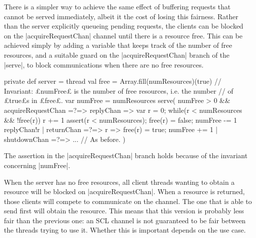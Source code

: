 

There is a simpler way to achieve the same effect of buffering requests that
cannot be served immediately, albeit it the cost of losing this fairness.
Rather than the server explicitly queueing pending requests, the clients can
be blocked on the |acquireRequestChan| channel until there is
a resource free.  This can be achieved simply by adding a variable that keeps
track of the number of free resources, and a suitable guard on the
|acquireRequestChan| branch of the |serve|, to block communications when there
are no free resources.%
%
\begin{scala}
  private def server = thread{
    val free = Array.fill(numResources)(true)
    // Invariant: £numFree£ is the number of free resources, i.e. the number 
    // of £true£s in £free£.
    var numFree = numResources
    serve(
      numFree > 0 && acquireRequestChan =?=> { replyChan => 
	var r = 0; while(r < numResources && !free(r)) r += 1
	assert(r < numResources); free(r) = false; numFree -= 1
        replyChan!r
      }
      | returnChan =?=> { r => free(r) = true; numFree += 1 }
      | shutdownChan =?=> { ... } // As before.
    )
  }
\end{scala}
%
The assertion in the |acquireRequestChan| branch holds because of
the invariant concerning |numFree|.

When the server has no free resources, all client threads wanting to obtain a
resource will be blocked on |acquireRequestChan|.
%
When a resource is returned, those clients will compete to communicate on the
channel.  The one that is able to send first will obtain the resource.
%
This means that this version is probably less fair than the previous one: an SCL
channel is not guaranteed to be fair between the threads trying to use it.
Whether this is important depends on the use case.






